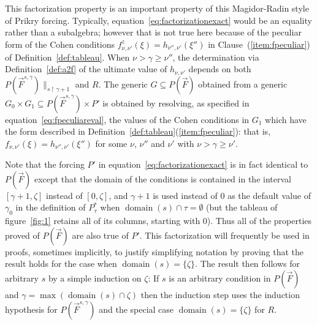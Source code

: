 \documentclass[
twoside,
]{article}
\theoremstyle{definition}
\theoremstyle{remark}
\newcommand{\below}[2]{#1{\|_{#2}}}
\newcommand{\sing}[1]{\{#1\}}
\newcommand{\restrict}{{\upharpoonright}}
\DeclareMathOperator{\domain}{domain}
\begin{document}
This factorization property is an important property of
this Magidor-Radin style of Prikry forcing.   
Typically, equation~\eqref{eq:factorizationexact} would be an equality
rather than a subalgebra; however that is not true here
because  
of the peculiar form of the 
Cohen conditions $f^z_{\nu,\nu'}(\xi)=h_{\nu'',\nu'}(\xi'')$
in Clause~(\ref{item:fpeculiar}) of Definition~\ref{def:tableau}.  
When $\nu>\gamma\ge\nu''$,  the determination via Definition~\ref{def:a2f}
of the ultimate value of $h_{\nu,\nu'}$ depends on both
$\below{P(\vec   F^{s,\gamma})}{s \restrict\gamma+1}$ and $R$.
The generic $G\subseteq P(\vec F)$  obtained from a generic
$G_0\times G_1\subseteq P(\vec F^{s,\gamma})\times P'$ is obtained by resolving,
as specified in
equation~\eqref{eq:fpeculiareval}, the values of the
Cohen conditions  in $G_1$ which have the form described in
Definition~\ref{def:tableau}(\ref{item:fpeculiar}): that is, 
$f_{\nu,\nu'}(\xi)=h_{\nu'',\nu'}(\xi'')$ for some $\nu$,
$\nu''$ and $\nu'$ with 
$\nu>\gamma\ge\nu'$. 

Note that the forcing $P'$ in equation~\eqref{eq:factorizationexact}
is in fact identical to $P(\vec F)$ except that the domain of the
conditions is contained in the interval $[\gamma+1,\zeta]$  instead of
$[0,\zeta]$, and $\gamma+1$ is used instead of $0$ as the default
value of $\gamma_0$  in the definition of
$P^*_{\tau}$ when 
$\domain(s)\cap\tau=\emptyset$ (but the tableau of
figure~\ref{fig:1} retains all of its columns, starting with $0$).
Thus all of the properties proved of $P(\vec F)$ are also true of $P'$.
This 
factorization  will frequently
be used in proofs, sometimes implicitly, to justify simplifying
notation by proving that the result holds for the case when
$\domain(s)=\sing{\zeta}$.
The result then follows for arbitrary $s$ by a simple induction on
$\zeta$:  If $s$ is an arbitrary condition in $P(\vec F)$ and
$\gamma=\max(\domain(s)\cap\zeta)$ then the induction step uses 
the induction 
hypothesis for $P(\vec F^{s,\gamma})$ and the special case
$\domain(s)=\sing{\zeta}$ for $R$.
\end{document}
